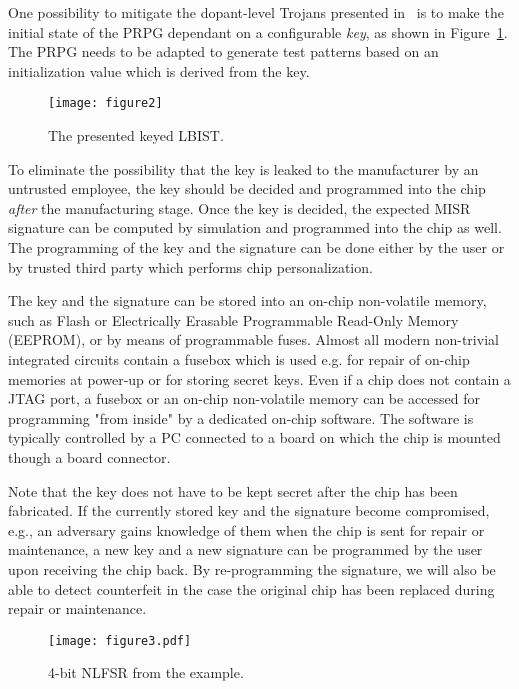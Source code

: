 \documentclass[a4paper]{llncs}
\begin{document}
One possibility to mitigate the dopant-level Trojans presented in~\cite{BeRPB13} is to make the initial state of the PRPG dependant on a configurable {\em key}, as shown in Figure~\ref{f2}. The PRPG needs to be adapted to generate test patterns based on an initialization value which is derived from the key.


\begin{figure}[t!]
\begin{center}
\texttt{[image: figure2]}
\caption{The presented keyed LBIST.}\label{f2} 
\end{center}
\end{figure}


To eliminate the possibility that the key is leaked to the manufacturer by an untrusted employee, the key should be decided and programmed into the chip {\em after} the manufacturing stage. 
Once the key is decided, the expected MISR signature can be computed by simulation and programmed into the chip as well.
The programming of the key and the signature can be done either by the user or by trusted third party which performs chip personalization.

The key and the signature can be stored into an on-chip non-volatile memory, such as Flash or Electrically Erasable Programmable Read-Only Memory (EEPROM), or by means of programmable fuses. 
Almost all modern non-trivial integrated circuits contain a fusebox which is used e.g. for repair of on-chip memories at power-up or for storing secret keys. 
Even if a chip does not contain a JTAG port,
a fusebox or an on-chip non-volatile memory can be accessed for programming "from inside" by a dedicated on-chip software. The software is typically controlled by a PC connected to a board on which the chip is mounted though a board connector. 

Note that the key does not have to be kept secret after the chip has been fabricated. If the currently stored key and the signature become compromised, e.g., an adversary gains knowledge of them when the chip is sent for repair or maintenance, a new key and a new signature can be
programmed by the user upon receiving the chip back. By re-programming the signature, we will also be able to detect counterfeit in the case the original chip has been replaced during repair or maintenance.

\begin{figure}[t!]
\begin{center}
\texttt{[image: figure3.pdf]}
\caption{4-bit NLFSR from the example.}\label{f4} 
\end{center}
\end{figure}
\end{document}
